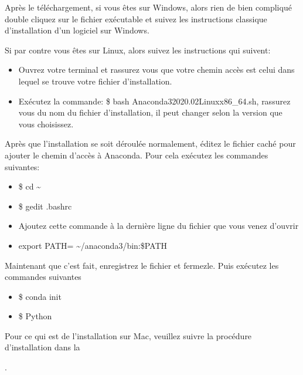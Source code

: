 \documentclass[letterpaper,11pt,english]{sphinxmanual}
\begin{document}
\sphinxAtStartPar
Après le téléchargement, si vous êtes sur Windows, alors rien de bien
compliqué double cliquez sur le fichier exécutable et suivez les
instructions classique d’installation d’un logiciel sur Windows.

\sphinxAtStartPar
Si par contre vous êtes sur Linux, alors suivez les instructions qui
suivent:
\begin{itemize}
\item {} 
\sphinxAtStartPar
Ouvrez votre terminal et rassurez vous que votre chemin accès est
celui dans lequel se trouve votre fichier d’installation.

\item {} 
\sphinxAtStartPar
Exécutez la commande: \$ bash Anaconda3\sphinxhyphen{}2020.02\sphinxhyphen{}Linux\sphinxhyphen{}x86\_64.sh,
rassurez vous du nom du fichier d’installation, il peut changer selon
la version que vous choisissez.

\end{itemize}

\sphinxAtStartPar
Après que l’installation se soit déroulée normalement, éditez le fichier
caché  pour ajouter le chemin d’accès à Anaconda. Pour cela
exécutez les commandes suivantes:
\begin{itemize}
\item {} 
\sphinxAtStartPar
\$ cd \textasciitilde{}

\item {} 
\sphinxAtStartPar
\$ gedit .bashrc

\item {} 
\sphinxAtStartPar
Ajoutez cette commande à la dernière ligne du fichier que vous venez
d’ouvrir

\item {} 
\sphinxAtStartPar
export PATH= \textasciitilde{}/anaconda3/bin:\$PATH

\end{itemize}

\sphinxAtStartPar
Maintenant que c’est fait, enregistrez le fichier et fermez\sphinxhyphen{}le. Puis
exécutez les commandes suivantes
\begin{itemize}
\item {} 
\sphinxAtStartPar
\$ conda init

\item {} 
\sphinxAtStartPar
\$ Python

\end{itemize}

\sphinxAtStartPar
Pour ce qui est de l’installation sur Mac, veuillez suivre la procédure
d’installation dans la %
\begin{footnote}[3]\sphinxAtStartFootnote
{}
%
\end{footnote}.
\end{document}
